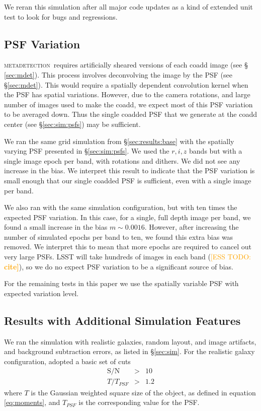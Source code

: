 \documentclass[iop, twocolappendix, appendixfloats, numberedappendix, apj]{hackemulateapj}
\newcommand{\esstodo}[1]{\textcolor{orange}{[ESS TODO: \bf #1]}}
\newcommand{\mdet}{\textsc{metadetection}}
\begin{document}
We reran this simulation after all major code updates as a kind of extended
unit test to look for bugs and regressions.

\subsection{PSF Variation} \label{sec:results:psfvar}

\mdet\ requires artificially sheared versions of each coadd image (see \S
\ref{sec:mdet}).  This process involves deconvolving the image by the PSF (see
\S \ref{sec:mdet}).  This would require a spatially dependent convolution
kernel when the PSF has spatial variations.  However, due to the camera
rotations, and large number of images used to make the coadd, we expect most of
this PSF variation to be averaged down.  Thus the single coadded PSF that we
generate at the coadd center (see \S \ref{sec:sim:psfs}) may be sufficient.

We ran the same grid simulation from \S \ref{sec:results:base} with the
spatially varying PSF presented in \S \ref{sec:sim:psfs}. We used the $r, i, z$
bands but with a single image epoch per band, with rotations and dithers. We
did not see any increase in the bias.   We interpret this result to indicate
that the PSF variation is small enough that our single coadded PSF is
sufficient, even with a single image per band.

We also ran with the same simulation configuration, but with ten times the
expected PSF variation. In this case, for a single, full depth image per band,
we found a small increase in the bias $m \sim 0.0016$.  However, after
increasing the number of simulated epochs per band to ten, we found this extra
bias was removed.  We interpret this to mean that more epochs are required to
cancel out very large PSFs.  LSST will take hundreds of images in each band
(\esstodo{cite}), so we do no expect PSF variation to be a significant source
of bias.

For the remaining tests in this paper we use the spatially variable PSF with
expected variation level.

\subsection{Results with Additional Simulation Features} \label{sec:results:more}

We ran the simulation with realistic galaxies, random layout, and image
artifacts, and background subtraction errors, as listed in \S \ref{sec:sim}.
For the realistic galaxy configuration, adopted a basic set of cuts
\begin{eqnarray}
    \mathrm{S/N} & > & 10 \\
    T/T_{PSF} & > & 1.2
\end{eqnarray}
where $T$ is the Gaussian weighted square size of the object,
as defined in equation \ref{eq:moments}, and $T_{PSF}$ is the corresponding
value for the PSF.
\end{document}
